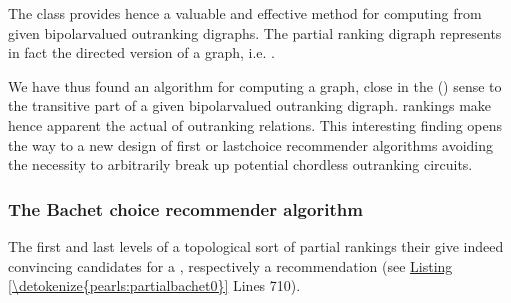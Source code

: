 \documentclass[a4paper,12pt,english]{sphinxhowto}
\begin{document}
\sphinxAtStartPar
The  class provides hence a valuable and effective method for computing  from given bipolar\sphinxhyphen{}valued outranking digraphs. The partial  ranking digraph represents in fact the directed version of a  graph, i.e.  .

\begin{sphinxVerbatim}[commandchars=\\\{\},numbers=left,firstnumber=1,stepnumber=1]
  
\end{sphinxVerbatim}

\sphinxAtStartPar
We have thus found an algorithm for computing a  graph, close in the {\hyperref[\detokenize{pearls:ordinalcorrelation-tutorial-label}]{}} () sense to the transitive part of a given bipolar\sphinxhyphen{}valued outranking digraph.  rankings make hence apparent the actual  of outranking relations. This interesting finding opens the way to a new design of first\sphinxhyphen{} or last\sphinxhyphen{}choice recommender algorithms avoiding the necessity to arbitrarily break up potential chordless outranking circuits.


\subsubsection{The Bachet choice recommender algorithm}
\label{\detokenize{pearls:the-bachet-choice-recommender-algorithm}}\label{\detokenize{pearls:bachet-choice-recommender-tutorial-label}}
\sphinxAtStartPar
The first and last levels of a topological sort of partial rankings \textendash{}their \textendash{} give indeed convincing candidates for a , respectively a  recommendation (see \hyperref[\detokenize{pearls:partialbachet0}]{Listing \ref{\detokenize{pearls:partialbachet0}}} Lines 7\sphinxhyphen{}10).
\end{document}
